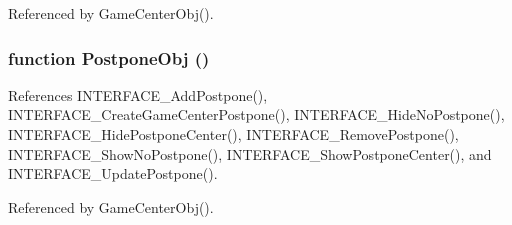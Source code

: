 Referenced by GameCenterObj().
\subsubsection[PostponeObj]{\setlength{\rightskip}{0pt plus 5cm}function PostponeObj ()}\label{interface_2gamecenter_8js_103f298318c72f6f6516a5b079748bde}




References INTERFACE\_\-AddPostpone(), INTERFACE\_\-CreateGameCenterPostpone(), INTERFACE\_\-HideNoPostpone(), INTERFACE\_\-HidePostponeCenter(), INTERFACE\_\-RemovePostpone(), INTERFACE\_\-ShowNoPostpone(), INTERFACE\_\-ShowPostponeCenter(), and INTERFACE\_\-UpdatePostpone().

Referenced by GameCenterObj().